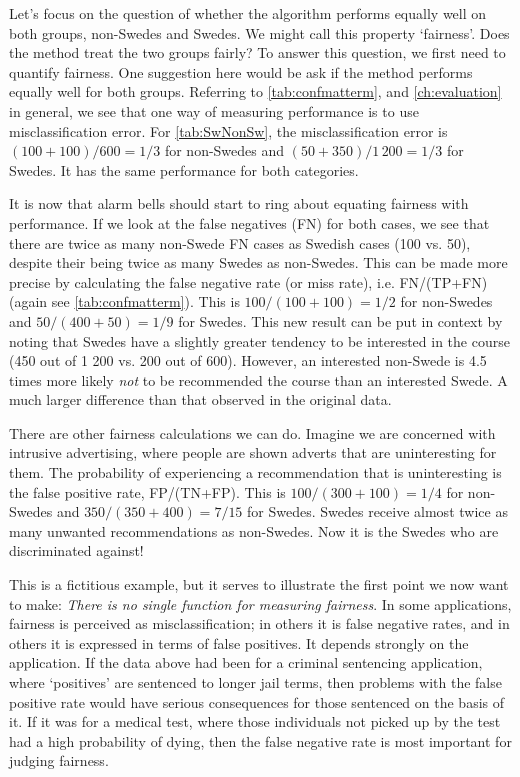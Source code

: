 	
Let's focus on the question of whether the algorithm performs equally well on both groups, non-Swedes and Swedes. We might call this property `fairness'. Does the method treat the two groups fairly? To answer this question, we first need to quantify fairness. One suggestion here would be ask if the method performs equally well for both groups. Referring to \cref{tab:confmatterm}, and \cref{ch:evaluation} in general, we see that one way of measuring performance is to use misclassification error. For \cref{tab:SwNonSw}, the misclassification error is $(100+100)/600=1/3$ for non-Swedes and $(50+350)/1\,200=1/3$ for Swedes. It has the same performance for both categories.

\enlargethispage{-\baselineskip}

It is now that alarm bells should start to ring about equating fairness with performance. If we look at the false negatives (FN) for both cases, we see that there are twice as many non-Swede FN cases as Swedish cases (100 vs. 50), despite their being twice as many Swedes as non-Swedes. This can be made more precise by calculating the false negative rate (or miss rate), i.e. FN/(TP+FN) (again see \cref{tab:confmatterm}). This is $100/(100+100)=1/2$ for non-Swedes and $50/(400+50)=1/9$ for Swedes. This new result can be put in context by noting that Swedes have a slightly greater tendency to be interested in the course (450 out of 1 200 vs. 200 out of 600). However, an interested non-Swede is 4.5 times more likely \textit{not} to be recommended the course than an interested Swede. A much larger difference than that observed in the original data.


There are other fairness calculations we can do. Imagine we are concerned with intrusive advertising, where people are shown adverts that are uninteresting for them. The probability of experiencing a recommendation that is uninteresting is the false positive rate, FP/(TN+FP). This is $100/(300+100)=1/4$ for non-Swedes and $350/(350+400)=7/15$ for Swedes. Swedes receive almost twice as many unwanted recommendations as non-Swedes. Now it is the Swedes who are discriminated against!

This is a fictitious example, but it serves to illustrate the first point we now want to make: \textit{There is no single function for measuring fairness}. In some applications, fairness is perceived as misclassification; in others it is false negative rates, and in others it is expressed in terms of false positives. It depends strongly on the application. If the data above had been for a criminal sentencing application, where `positives' are sentenced to longer jail terms, then problems with the false positive rate would have serious consequences for those sentenced on the basis of it. If it was for a medical test, where those individuals not picked up by the test had a high probability of dying, then the false negative rate is most important for judging fairness.

